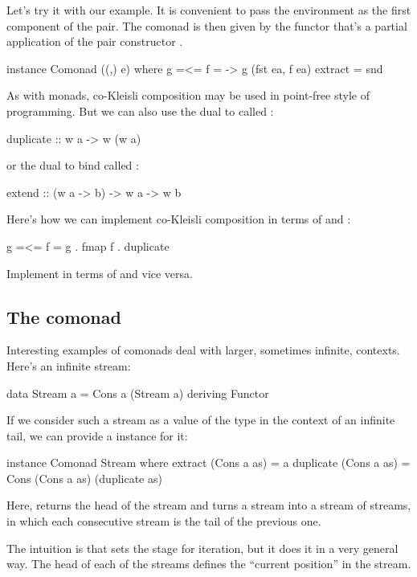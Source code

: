 \documentclass[DaoFP]{subfiles}
\begin{document}
Let's try it with our example. It is convenient to pass the environment as the first component of the pair. The comonad is then given by the functor that's a partial application of the pair constructor .
\begin{haskell}
instance Comonad ((,) e) where
  g =<= f = \ea -> g (fst ea, f ea)
  extract = snd
\end{haskell}

As with monads, co-Kleisli composition may be used in point-free style of programming. But we can also use the dual to  called :
\begin{haskell}
  duplicate :: w a -> w (w a)
\end{haskell}
or the dual to bind called :
\begin{haskell}
  extend :: (w a -> b) -> w a -> w b
\end{haskell}
Here's how we can implement co-Kleisli composition in terms of  and :
\begin{haskell}
   g =<= f = g . fmap f . duplicate
\end{haskell}
\begin{exercise}
Implement  in terms of  and vice versa.
\end{exercise}
\subsection{The  comonad}
Interesting examples of comonads deal with larger, sometimes infinite, contexts. Here's an infinite stream:
\begin{haskell}
data Stream a = Cons a (Stream a)
    deriving Functor
\end{haskell}

If we consider such a stream as a value of the type  in the context of an infinite tail, we can provide a  instance for it:
\begin{haskell}
instance Comonad Stream where
  extract (Cons a as) = a
  duplicate (Cons a as) = Cons (Cons a as) (duplicate as)
\end{haskell}
Here,  returns the head of the stream and  turns a stream into a stream of streams, in which each consecutive stream is the tail of the previous one. 

The intuition is that  sets the stage for iteration, but it does it in a very general way. The head of each of the streams defines the ``current position'' in the stream. 
\end{document}

